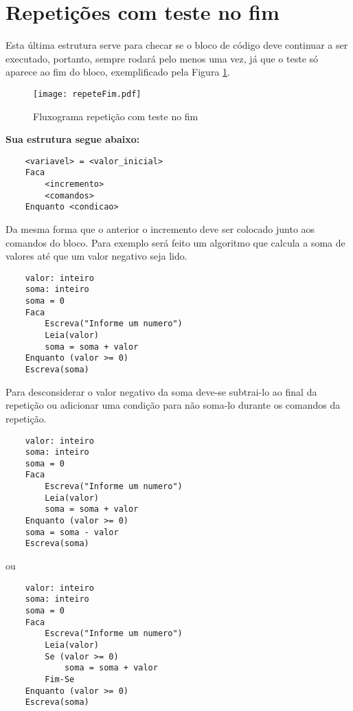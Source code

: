 \section{Repetições com teste no fim}
Esta última estrutura serve para checar se o bloco de código deve continuar a ser executado, portanto, sempre rodará pelo menos uma vez, já que o teste só aparece ao fim do bloco, exemplificado pela Figura \ref{fig:repeteFim}.
\begin{figure}[H]
    \centering
    \texttt{[image: repeteFim.pdf]}
    \caption{Fluxograma repetição com teste no fim}
    \label{fig:repeteFim}
\end{figure}
\textbf{Sua estrutura segue abaixo:}
\begin{lstlisting}
    <variavel> = <valor_inicial>
    Faca
        <incremento>
        <comandos>
    Enquanto <condicao>
\end{lstlisting}
Da mesma forma que o anterior o incremento deve ser colocado junto aos comandos do bloco. Para exemplo será feito um algoritmo que calcula a soma de valores até que um valor negativo seja lido.
\begin{lstlisting}
    valor: inteiro
    soma: inteiro
    soma = 0
    Faca
        Escreva("Informe um numero")
        Leia(valor)
        soma = soma + valor
    Enquanto (valor >= 0)
    Escreva(soma)
\end{lstlisting}
Para desconsiderar o valor negativo da soma deve-se subtrai-lo ao final da repetição ou adicionar uma condição para não soma-lo durante os comandos da repetição.
\begin{lstlisting}
    valor: inteiro
    soma: inteiro
    soma = 0
    Faca
        Escreva("Informe um numero")
        Leia(valor)
        soma = soma + valor
    Enquanto (valor >= 0)
    soma = soma - valor
    Escreva(soma)
\end{lstlisting}
ou
\begin{lstlisting}
    valor: inteiro
    soma: inteiro
    soma = 0
    Faca
        Escreva("Informe um numero")
        Leia(valor)
        Se (valor >= 0)
            soma = soma + valor
        Fim-Se
    Enquanto (valor >= 0)
    Escreva(soma)
\end{lstlisting}